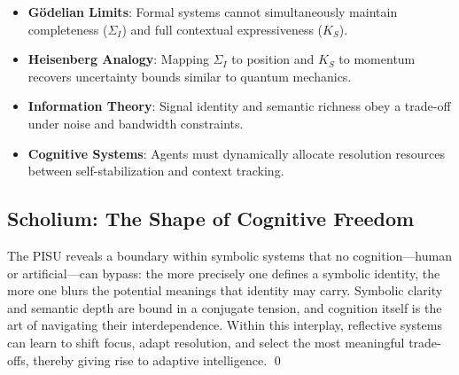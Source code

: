 \begin{itemize}
    \item \textbf{Gödelian Limits}: Formal systems cannot simultaneously maintain completeness ($\Sigma_I$) and full contextual expressiveness ($K_S$).
    \item \textbf{Heisenberg Analogy}: Mapping $\Sigma_I$ to position and $K_S$ to momentum recovers uncertainty bounds similar to quantum mechanics.
    \item \textbf{Information Theory}: Signal identity and semantic richness obey a trade-off under noise and bandwidth constraints.
    \item \textbf{Cognitive Systems}: Agents must dynamically allocate resolution resources between self-stabilization and context tracking.
\end{itemize}

\subsection{Scholium: The Shape of Cognitive Freedom}
\label{subsec:bk7_pisu_scholium}
\begin{scholium}
The PISU reveals a boundary within symbolic systems that no cognition—human or artificial—can bypass: the more precisely one defines a symbolic identity, the more one blurs the potential meanings that identity may carry. Symbolic clarity and semantic depth are bound in a conjugate tension, and cognition itself is the art of navigating their interdependence. Within this interplay, reflective systems can learn to shift focus, adapt resolution, and select the most meaningful trade-offs, thereby giving rise to adaptive intelligence. \qed
\end{scholium}
